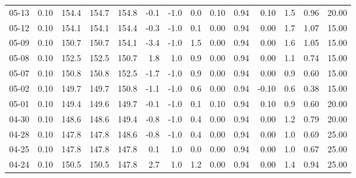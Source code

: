 \begin{threeparttable}
{\begin{tabular}{lrrrrrrrrrrrrr}
  05-13 &     0.10 & 154.4 & 154.7 & 154.8 &       -0.1 &                     -1.0 &                 0.0 &       0.10 &      0.94 &           0.10 &              1.5 &            0.96 &                  20.00 \\
  05-12 &     0.10 & 154.1 & 154.1 & 154.4 &       -0.3 &                     -1.0 &                 0.1 &       0.00 &      0.94 &           0.00 &              1.7 &            1.07 &                  15.00 \\
  05-09 &     0.10 & 150.7 & 150.7 & 154.1 &       -3.4 &                     -1.0 &                 1.5 &       0.00 &      0.94 &           0.00 &              1.6 &            1.05 &                  15.00 \\
  05-08 &     0.10 & 152.5 & 152.5 & 150.7 &        1.8 &                      1.0 &                 0.9 &       0.00 &      0.94 &           0.00 &              1.1 &            0.74 &                  15.00 \\
  05-07 &     0.10 & 150.8 & 150.8 & 152.5 &       -1.7 &                     -1.0 &                 0.9 &       0.00 &      0.94 &           0.00 &              0.9 &            0.60 &                  15.00 \\
  05-02 &     0.10 & 149.7 & 149.7 & 150.8 &       -1.1 &                     -1.0 &                 0.6 &       0.00 &      0.94 &          -0.10 &              0.6 &            0.38 &                  15.00 \\
  05-01 &     0.10 & 149.4 & 149.6 & 149.7 &       -0.1 &                     -1.0 &                 0.1 &       0.10 &      0.94 &           0.10 &              0.9 &            0.60 &                  20.00 \\
  04-30 &     0.10 & 148.6 & 148.6 & 149.4 &       -0.8 &                     -1.0 &                 0.4 &       0.00 &      0.94 &           0.00 &              1.2 &            0.79 &                  20.00 \\
  04-28 &     0.10 & 147.8 & 147.8 & 148.6 &       -0.8 &                     -1.0 &                 0.4 &       0.00 &      0.94 &           0.00 &              1.0 &            0.69 &                  25.00 \\
  04-25 &     0.10 & 147.8 & 147.8 & 147.8 &        0.1 &                      1.0 &                 0.0 &       0.00 &      0.94 &           0.00 &              1.0 &            0.67 &                  25.00 \\
  04-24 &     0.10 & 150.5 & 150.5 & 147.8 &        2.7 &                      1.0 &                 1.2 &       0.00 &      0.94 &           0.00 &              1.4 &            0.94 &                  25.00 \\

\end{tabular}}
\end{threeparttable}
